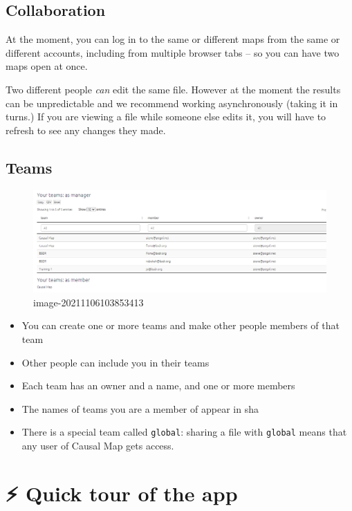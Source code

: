 \documentclass[
]{book}
\providecommand{\tightlist}{%
  \setlength{\itemsep}{0pt}\setlength{\parskip}{0pt}}
\begin{document}
\hypertarget{collaboration}{%
\section{Collaboration}\label{collaboration}}

At the moment, you can log in to the same or different maps from the same or different accounts, including from multiple browser tabs -- so you can have two maps open at once.

Two different people \emph{can} edit the same file. However at the moment the results can be unpredictable and we recommend working asynchronously (taking it in turns.) If you are viewing a file while someone else edits it, you will have to refresh to see any changes they made.

\hypertarget{teams}{%
\section{Teams}\label{teams}}

\begin{figure}
\centering
\includegraphics{_assets/image-20211106103853413.png}
\caption{image-20211106103853413}
\end{figure}

\begin{itemize}
\tightlist
\item
  You can create one or more teams and make other people members of that team
\item
  Other people can include you in their teams
\item
  Each team has an owner and a name, and one or more members
\item
  The names of teams you are a member of appear in sha
\item
  There is a special team called \texttt{global}: sharing a file with \texttt{global} means that any user of Causal Map gets access.
\end{itemize}

\hypertarget{quick-tour}{%
\chapter{⚡ Quick tour of the app}\label{quick-tour}}
\end{document}
